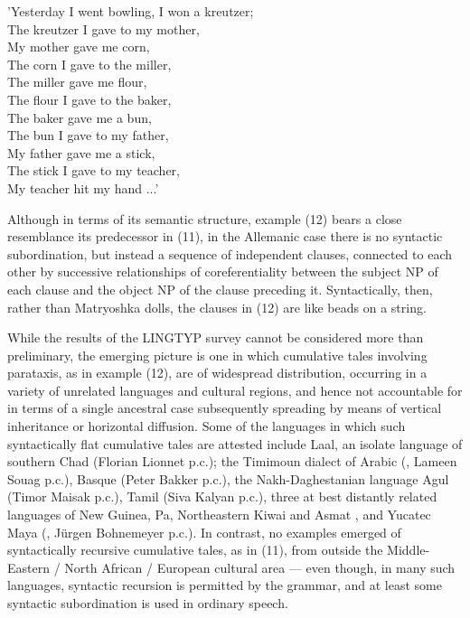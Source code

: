 \documentclass[output=paper,colorlinks,citecolor=brown
]{langscibook}
\begin{document}
'Yesterday I went bowling, I won a kreutzer;\\
The kreutzer I gave to my mother, \\
My mother gave me corn, \\
The corn I gave to the miller, \\
The miller gave me flour, \\
The flour I gave to the baker, \\
The baker gave me a bun, \\
The bun I gave to my father, \\
My father gave me a stick, \\
The stick I gave to my teacher, \\
My teacher hit my hand ...' \\

\z

Although in terms of its semantic structure, example (12) bears a close resemblance its predecessor in (11), in the Allemanic case there is no syntactic subordination, but instead a sequence of independent clauses, connected to each other by successive relationships of coreferentiality between the subject NP of each clause and the object NP of the clause preceding it.  Syntactically, then, rather than Matryoshka dolls, the clauses in (12) are like beads on a string.

While the results of the LINGTYP survey cannot be considered more than preliminary, the emerging picture is one in which cumulative tales involving parataxis, as in example (12), are of widespread distribution, occurring in a variety of unrelated languages and cultural regions, and hence not accountable for in terms of a single ancestral case subsequently spreading by means of vertical inheritance or horizontal diffusion.  Some of the languages in which such syntactically flat cumulative tales are attested include Laal, an isolate language of southern Chad (Florian Lionnet p.c.); the Timimoun dialect of Arabic (\cite{mammeri1985ahellil}, Lameen Souag p.c.), Basque (Peter Bakker p.c.), the Nakh-Daghestanian language Agul (Timor Maisak p.c.), Tamil (Siva Kalyan p.c.), three at best distantly related languages of New Guinea, Pa, Northeastern Kiwai and Asmat \citep{voorhoeve2010remarkable}, and Yucatec Maya (\cite[180-186]{smailus1975textos}, Jürgen Bohnemeyer p.c.).  In contrast, no examples emerged of syntactically recursive cumulative tales, as in (11), from outside the Middle-Eastern / North African / European cultural area — even though, in many such languages, syntactic recursion is permitted by the grammar, and at least some syntactic subordination is used in ordinary speech.  
\end{document}
